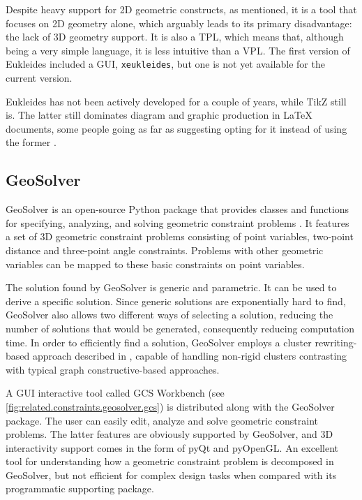 Despite heavy support for 2D geometric constructs, as mentioned, it is a tool
that focuses on 2D geometry alone, which arguably leads to its primary
disadvantage: the lack of 3D geometry support.  It is also a \ac{TPL}, which
means that, although being a very simple language, it is less intuitive than a
\ac{VPL}.  The first version of Eukleides included a \ac{GUI},
\texttt{xeukleides}, but one is not yet available for the current version.

Eukleides has not been actively developed for a couple of years, while
\acs{TikZ} still is.  The latter still dominates diagram and graphic production
in \LaTeX{} documents, some people going as far as suggesting opting for it
instead of using the former \cite{Christian:2014:TEXE:Eukleides}.

\subsection{GeoSolver}
\label{sec:related.constraints.geosolver}

GeoSolver is an open-source Python package that provides classes and functions
for specifying, analyzing, and solving geometric constraint problems
\cite{Van:2009:GeoSolver}.  It features a set of 3D geometric constraint
problems consisting of point variables, two-point distance and three-point angle
constraints.  Problems with other geometric variables can be mapped to these
basic constraints on point variables.

The solution found by GeoSolver is generic and parametric.  It can be used to
derive a specific solution.  Since generic solutions are exponentially hard to
find, GeoSolver also allows two different ways of selecting a solution, reducing
the number of solutions that would be generated, consequently reducing
computation time.  In order to efficiently find a solution, GeoSolver employs a
cluster rewriting-based approach described in \cite{Van:2009:NRCRASSGC}, capable
of handling non-rigid clusters contrasting with typical graph constructive-based
approaches.

A \ac{GUI} interactive tool called \ac{GCS} Workbench \cite{De:2008:WGCS} (see
\cref{fig:related.constraints.geosolver.gcs}) is distributed along with the
GeoSolver package.  The user can easily edit, analyze and solve geometric
constraint problems.  The latter features are obviously supported by GeoSolver,
and 3D interactivity support comes in the form of pyQt and pyOpenGL. An
excellent tool for understanding how a geometric constraint problem is
decomposed in GeoSolver, but not efficient for complex design tasks when
compared with its programmatic supporting package.

